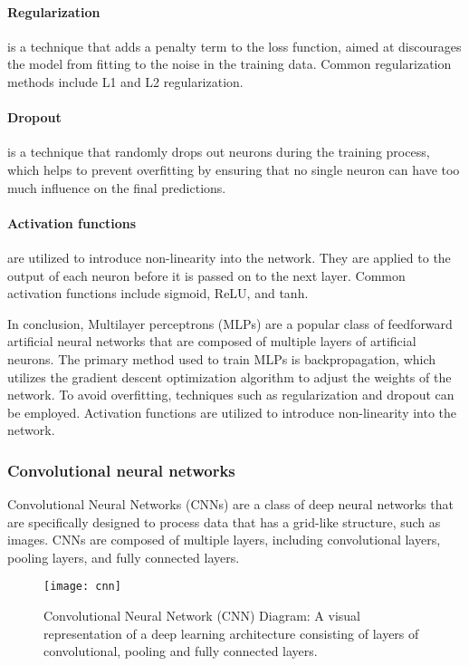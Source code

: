 \paragraph {Regularization} is a technique that adds a penalty term to the loss function, aimed at discourages the model from fitting to the noise in the training data. Common regularization methods include L1 and L2 regularization.

\paragraph {Dropout} is a technique that randomly drops out neurons during the training process, which helps to prevent overfitting by ensuring that no single neuron can have too much influence on the final predictions.

\paragraph{Activation functions} are utilized to introduce non-linearity into the network. They are applied to the output of each neuron before it is passed on to the next layer. Common activation functions include sigmoid, ReLU, and tanh.

In conclusion, Multilayer perceptrons (MLPs) are a popular class of feedforward artificial neural networks that are composed of multiple layers of artificial neurons.
The primary method used to train MLPs is backpropagation, which utilizes the gradient descent optimization algorithm to adjust the weights of the network.
To avoid overfitting, techniques such as regularization and dropout can be employed.
Activation functions are utilized to introduce non-linearity into the network.



\subsubsection{Convolutional neural networks}
Convolutional Neural Networks (CNNs) are a class of deep neural networks that are specifically designed to process data that has a grid-like structure, such as images.
CNNs are composed of multiple layers, including convolutional layers, pooling layers, and fully connected layers.


\begin{figure}[!htbp]
  \centering
  \texttt{[image: cnn]}
  \caption{Convolutional Neural Network (CNN) Diagram: A visual representation of a deep learning architecture consisting of layers of convolutional, pooling and fully connected layers. \cite{shah}}
\end{figure}

